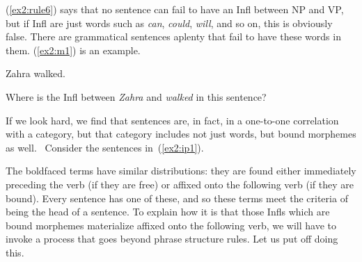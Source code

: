 (\ref{ex2:rule6}) says that no sentence can fail to have an Infl between NP and VP, but if Infl are just words such as \emph{can}, \emph{could}, \emph{will}, and so on, this is obviously false. There are grammatical sentences aplenty that fail to have these words in them. (\ref{ex2:m1}) is an example.
\begin{exe}
\ex \label{ex2:m1} Zahra walked.
\end{exe}
Where is the Infl between \emph{Zahra} and \emph{walked} in this sentence?

If we look hard, we find that sentences are, in fact, in a one-to-one correlation with a category, but that category includes not just words, but bound morphemes as well.%
%
%
%
\ Consider the sentences in~(\ref{ex2:ip1}).
\pagebreak
\begin{exe}
	\ex \label{ex2:ip1}
	\begin{xlist}
	\end{xlist}
\end{exe}
The boldfaced terms have similar distributions: they are found either immediately preceding the verb (if they are free) or affixed onto the following verb (if they are bound). Every sentence has one of these, and so these terms meet the criteria of being the head of a sentence. To explain how it is that those Infls which are bound morphemes materialize affixed onto the following verb, we will have to invoke a process that goes beyond phrase structure rules. Let us put off doing this.

